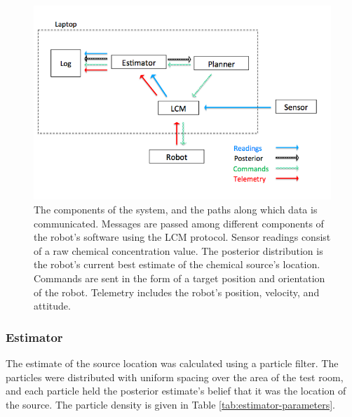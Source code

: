 \documentclass[submit, 12pt]{aiaa-pretty-modified}
\begin{document}
\begin{figure}
\begin{center}
\includegraphics[width=6in]{img/acquisition.pdf}
\caption[Data acquisition flowchart]{The components of the system, and the paths along which data is
  communicated. Messages are passed among different components of the robot's
  software using the LCM protocol.  Sensor readings consist of a raw
  chemical concentration value.  The
  posterior distribution is the robot's current best estimate of the chemical
  source's location. Commands are sent in the form of a target position and
  orientation of the robot. Telemetry includes the robot's position, velocity,
  and attitude.}
\label{fig:acquisition}
\end{center}
\end{figure}

\subsubsection{Estimator}

The estimate of the source location was calculated using a particle
filter\cite{maskell2001tutorial}. The particles were distributed with uniform
spacing over the area of the test room, and each particle held the posterior
estimate's belief that it was the location of the source. The particle density is given in Table
\ref{tab:estimator-parameters}. 
\end{document}
